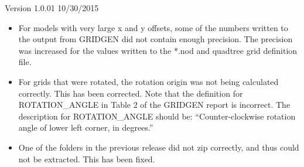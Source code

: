 \item Version 1.0.01 10/30/2015
\begin{itemize}[label=--]
  \item For models with very large x and y offsets, some of the numbers written to the output from GRIDGEN did not contain enough precision. The precision was increased for the values written to the *.nod and quadtree grid definition file.
  \item For grids that were rotated, the rotation origin was not being calculated correctly. This has been corrected. Note that the definition for ROTATION\_ANGLE in Table 2 of the GRIDGEN report is incorrect. The description for ROTATION\_ANGLE should be: ``Counter-clockwise rotation angle of lower left corner, in degrees.''
  \item One of the folders in the previous release did not zip correctly, and thus could not be extracted. This has been fixed.
\end{itemize}

